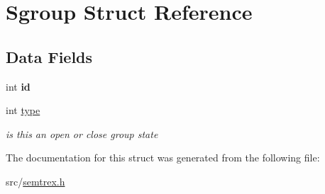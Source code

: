 \hypertarget{structSgroup}{\section{Sgroup Struct Reference}
\label{structSgroup}
}
\subsection*{Data Fields}
\begin{DoxyCompactItemize}
\item 
\hypertarget{structSgroup_a109c0dd2bd1575f6fecf8fa91e160da7}{int {\bfseries id}}\label{structSgroup_a109c0dd2bd1575f6fecf8fa91e160da7}

\item 
\hypertarget{structSgroup_ab2e4e1ecc5bd0bca43c29c03b822d367}{int \hyperlink{structSgroup_ab2e4e1ecc5bd0bca43c29c03b822d367}{type}}\label{structSgroup_ab2e4e1ecc5bd0bca43c29c03b822d367}

\begin{DoxyCompactList}\small\item\em is this an open or close group state \end{DoxyCompactList}\end{DoxyCompactItemize}


The documentation for this struct was generated from the following file\+:\begin{DoxyCompactItemize}
\item 
src/\hyperlink{semtrex_8h}{semtrex.\+h}\end{DoxyCompactItemize}
